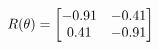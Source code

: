 \documentclass[preview]{standalone}
\begin{document}
\begin{align*}
\special{dvisvgm:raw <g id='unique000'>}R(\theta) = \begin{bmatrix}-0.91 & -0.41\\0.41 & -0.91\end{bmatrix}\special{dvisvgm:raw </g>}
\end{align*}
\end{document}
